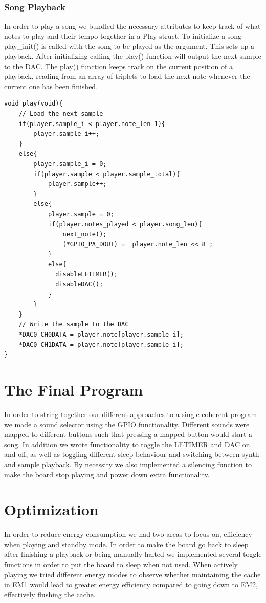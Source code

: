 \subsubsection{Song Playback}
In order to play a song we bundled the necessary attributes to keep track of what notes to play and their tempo together in a Play struct. To initialize a song play\_init() is called with the song to be played as the argument. This sets up a playback. After initializing calling the play() function will output the next sample to the DAC.
The play() function keeps track on the current position of a playback, reading from an array of triplets to load the next note whenever the current one has been finished.

\noindent\begin{minipage}{\textwidth}
\begin{lstlisting}
void play(void){
	// Load the next sample
	if(player.sample_i < player.note_len-1){			
		player.sample_i++;								
	}
	else{								
		player.sample_i = 0;
		if(player.sample < player.sample_total){
   			player.sample++;				
		}
		else{							
			player.sample = 0;
			if(player.notes_played < player.song_len){
				next_note();
				(*GPIO_PA_DOUT) =  player.note_len << 8 ;		
			}			 
			else{
			  disableLETIMER();
			  disableDAC();
			}
		}
	}
	// Write the sample to the DAC
	*DAC0_CH0DATA = player.note[player.sample_i];
	*DAC0_CH1DATA = player.note[player.sample_i];
}
\end{lstlisting}
\end{minipage}

\section{The Final Program}
In order to string together our different approaches to a single coherent program we made a sound selector using the GPIO functionality. Different sounds were mapped to different buttons such that pressing a mapped button would start a song. In addition we wrote functionality to toggle the LETIMER and DAC on and off, as well as toggling different sleep behaviour and switching between synth and sample playback. By necessity we also implemented a silencing function to make the board stop playing and power down extra functionality.

\section{Optimization}
In order to reduce energy consumption we had two areas to focus on, efficiency when playing and standby mode. In order to make the board go back to sleep after finishing a playback or being manually halted we implemented several toggle functions in order to put the board to sleep when not used. When actively playing we tried different energy modes to observe whether maintaining the cache in EM1 would lead to greater energy efficiency compared to going down to EM2, effectively flushing the cache.

